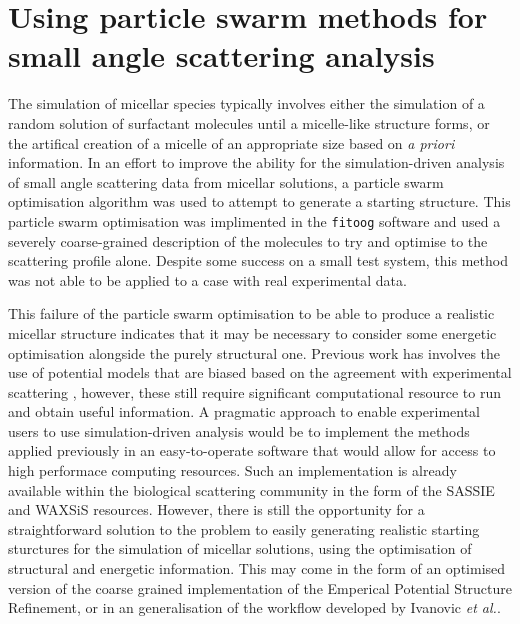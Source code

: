 \section{Using particle swarm methods for small angle scattering analysis}
The simulation of micellar species typically involves either the simulation of a random solution of surfactant molecules until a micelle-like structure forms, or the artifical creation of a micelle of an appropriate size based on \emph{a priori} information.
In an effort to improve the ability for the simulation-driven analysis of small angle scattering data from micellar solutions, a particle swarm optimisation algorithm was used to attempt to generate a starting structure.
This particle swarm optimisation was implimented in the \texttt{fitoog} software and used a severely coarse-grained description of the molecules to try and optimise to the scattering profile alone.
Despite some success on a small test system, this method was not able to be applied to a case with real experimental data.

This failure of the particle swarm optimisation to be able to produce a realistic micellar structure indicates that it may be necessary to consider some energetic optimisation alongside the purely structural one.
Previous work has involves the use of potential models that are biased based on the agreement with experimental scattering \cite{hargreaves_atomistic_2011,soper_coarse-grained_2017,ivanovic_temperature-dependent_2018}, however, these still require significant computational resource to run and obtain useful information.
A pragmatic approach to enable experimental users to use simulation-driven analysis would be to implement the methods applied previously in an easy-to-operate software that would allow for access to high performace computing resources.
Such an implementation is already available within the biological scattering community in the form of the SASSIE \cite{perkins_atomistic_2016} and WAXSiS \cite{knight_waxsis_2015} resources.
However, there is still the opportunity for a straightforward solution to the problem to easily generating realistic starting sturctures for the simulation of micellar solutions, using the optimisation of structural and energetic information.
This may come in the form of an optimised version of the coarse grained implementation of the Emperical Potential Structure Refinement,\autocite{soper_coarse-grained_2017} or in an generalisation of the workflow developed by Ivanovic \emph{et al.}.\autocite{ivanovic_temperature-dependent_2018}

